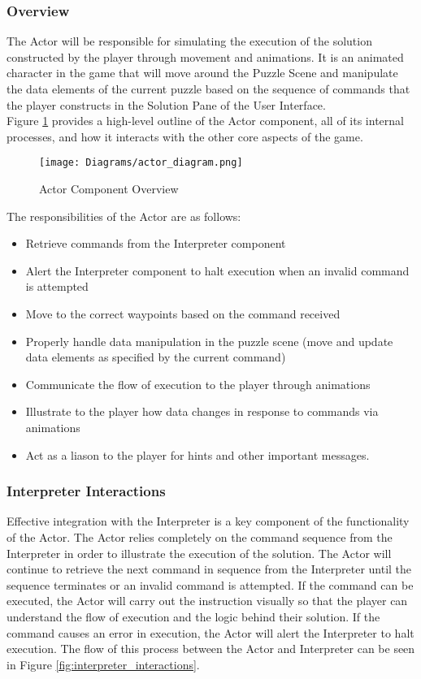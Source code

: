 \subsubsection{Overview}
The Actor will be responsible for simulating the execution of the solution constructed
by the player through movement and animations. It is an animated character in the game that will move around the Puzzle Scene and manipulate the data elements of the current puzzle based on the sequence of commands that the player constructs in the Solution Pane of the User Interface. \\

Figure \ref{fig:actor_diagram} provides a high-level outline of the Actor component, all of its internal processes, and how it interacts with the other core aspects of the game.\\

\begin{figure}[!htb]
  \caption{Actor Component Overview}
  \label{fig:actor_diagram}
  \centering
  \texttt{[image: Diagrams/actor\_diagram.png]}
\end{figure}
\newpage
The responsibilities of the Actor are as follows:

\begin{itemize}
	\item Retrieve commands from the Interpreter component
	\item Alert the Interpreter component to halt execution when an invalid command is attempted
	\item Move to the correct waypoints based on the command received
	\item Properly handle data manipulation in the puzzle scene (move and update data elements
			as specified by the current command)
	\item Communicate the flow of execution to the player through animations
	\item Illustrate to the player how data changes in response to commands via animations
	\item Act as a liason to the player for hints and other important messages.
\end{itemize}

\subsubsection{Interpreter Interactions}
Effective integration with the Interpreter is a key component of the functionality of the Actor. The Actor relies completely on the command sequence from the Interpreter in order to illustrate the execution of the solution. The Actor will continue to retrieve the next command in sequence from the Interpreter until the sequence terminates or an invalid command is attempted. If the command can be executed, the Actor will carry out the instruction visually so that the player can understand the flow of execution and the logic behind their solution. If the command causes an error in execution, the Actor will alert the Interpreter to halt execution. The flow of this process between the Actor and Interpreter can be seen in Figure \ref{fig:interpreter_interactions}.\\

